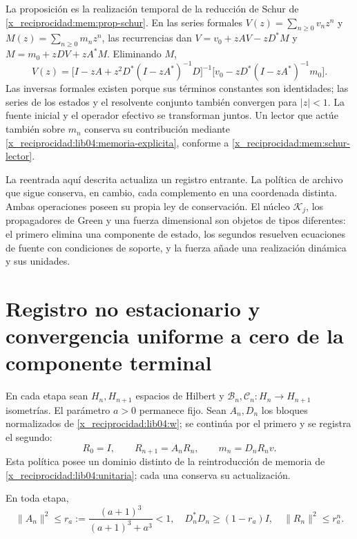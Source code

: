 La proposición es la realización temporal de la reducción de Schur de
\cref{x_reciprocidad:mem:prop-schur}. En las series formales
\(V(z)=\sum_{n\geq0}v_nz^n\) y
\(M(z)=\sum_{n\geq0}m_nz^n\), las recurrencias dan
\(V=v_0+zAV-zD^*M\) y \(M=m_0+zDV+zA^*M\). Eliminando \(M\),
\begin{equation}
 V(z)=\bigl[I-zA+z^2D^*(I-zA^*)^{-1}D\bigr]^{-1}
       \bigl[v_0-zD^*(I-zA^*)^{-1}m_0\bigr].
 \label{x_reciprocidad:lib04:schur-bilateral}
\end{equation}
Las inversas formales existen porque sus términos constantes son identidades;
las series de los estados y el resolvente conjunto también convergen para
\(|z|<1\). La fuente inicial y el operador efectivo se transforman juntos.
Un lector que actúe también sobre \(m_n\) conserva su contribución mediante
\eqref{x_reciprocidad:lib04:memoria-explicita}, conforme a \eqref{x_reciprocidad:mem:schur-lector}.

La reentrada aquí descrita actualiza un registro entrante. La política de
archivo que sigue conserva, en cambio, cada complemento en una coordenada
distinta. Ambas operaciones poseen su propia ley de conservación. El núcleo
\(\mathscr K_j\), los propagadores de Green y una fuerza dimensional son
objetos de tipos diferentes: el primero elimina una componente de estado,
los segundos resuelven ecuaciones de fuente con condiciones de soporte, y
la fuerza añade una realización dinámica y sus unidades.



\section{Registro no estacionario y convergencia uniforme a cero de la componente terminal}
\label{x_reciprocidad:lib04:archivo}

En cada etapa sean \(H_n,H_{n+1}\) espacios de Hilbert y
\(\mathcal B_n,\mathcal C_n:H_n\to H_{n+1}\) isometrías. El
parámetro \(a>0\) permanece fijo. Sean \(A_n,D_n\) los bloques
normalizados de \eqref{x_reciprocidad:lib04:w}; se continúa por el primero y se
registra el segundo:
\begin{equation}
 R_0=I,\qquad R_{n+1}=A_nR_n,\qquad m_n=D_nR_nv.
 \label{x_reciprocidad:lib04:politica-archivo}
\end{equation}
Esta política posee un dominio distinto de la reintroducción de
memoria de \eqref{x_reciprocidad:lib04:unitaria}; cada una conserva su actualización.

\begin{lemma}
\label{x_reciprocidad:lib04:lem-tasa}
En toda etapa,
\begin{equation}
 \|A_n\|^2\leq r_a:={\frac{(a+1)^3}{(a+1)^3+a^3}}<1,
 \quad D_n^*D_n\geq(1-r_a)I,
 \quad\|R_n\|^2\leq r_a^n.
 \label{x_reciprocidad:lib04:tasa}
\end{equation}
\end{lemma}

